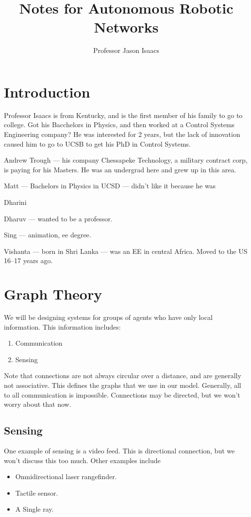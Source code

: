 \documentclass{article}
\title{Notes for Autonomous Robotic Networks}
\author{Professor Jason Isaacs}
\date{}
\begin{document}
\maketitle
\section{Introduction}
Professor Isaacs is from Kentucky, and is the first member of his family to go
to college. Got his Bacchelors in Physics, and then worked at a Control Systems
Engineering company? He was interested for 2 years, but the lack of innovation
caused him to go to UCSB to get his PhD in Control Systems. 

Andrew Trough --- his company Chessapeke Technology, a military contract corp,  is
paying for his Masters. He was an undergrad here and grew up in this area. 

Matt --- Bachelors in Physics in UCSD --- didn't like it because he was

Dharini

Dharuv --- wanted to be a professor. 

Sing --- animation, ee degree. 

Vishanta --- born in Shri Lanka --- was an EE in central Africa. Moved to the US
16--17 years ago. 

\section{Graph Theory}
We will be designing systems for groups of agents who have only local
information. This information includes:
\begin{enumerate}
\item Communication
\item Sensing
\end{enumerate}
Note that connections are not always circular over a distance, and are generally
not associative. This defines the graphs that we use in our model. Generally,
all to all communication is impossible. Connections may be directed, but we
won't worry about that now. 

\subsection{Sensing}
One example of sensing is a video feed. This is directional connection, but we
won't discuss this too much. Other examples include
\begin{itemize}
\item Omnidirectional laser rangefinder. 
\item Tactile sensor.
\item A Single ray. 
\end{itemize}
\end{document}
